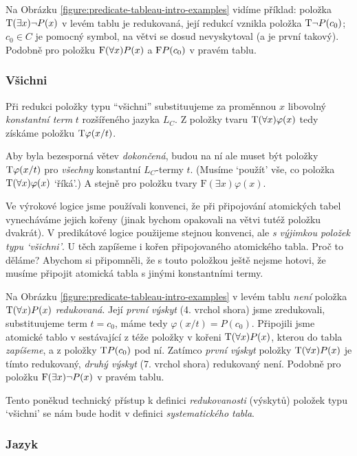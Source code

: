 Na Obrázku \ref{figure:predicate-tableau-intro-examples} vidíme příklad: položka $\mathrm{T}(\exists x)\neg P(x)$ v levém tablu je redukovaná, její redukcí vznikla položka $\mathrm{T}\neg P(c_0)$; $c_0\in C$ je pomocný symbol, na větvi se dosud nevyskytoval (a je první takový). Podobně pro položku $\mathrm{F}(\forall x)P(x)$ a $\mathrm{F} P(c_0)$ v pravém tablu.

\subsubsection{Všichni}
Při redukci položky typu ``všichni'' substituujeme za proměnnou $x$ libovolný \emph{konstantní term} $t$ rozšířeného jazyka $L_C$. Z položky tvaru $\mathrm{T}(\forall x)\varphi(x)$ tedy získáme položku $\mathrm{T}\varphi(x/t)$. 

Aby byla bezesporná větev \emph{dokončená}, budou na ní ale muset být položky $\mathrm{T}\varphi(x/t)$ pro \emph{všechny} konstantní $L_C$-termy $t$. (Musíme `použít' vše, co položka $\mathrm{T}(\forall x)\varphi(x)$ `říká'.) A stejně pro položku tvary $\mathrm{F}(\exists x)\varphi(x)$.

Ve výrokové logice jsme používali konvenci, že při připojování atomických tabel vynecháváme jejich kořeny (jinak bychom opakovali na větvi tutéž položku dvakrát). V predikátové logice použijeme stejnou konvenci, ale \emph{s výjimkou položek typu `všichni'}. U těch zapíšeme i kořen připojovaného atomického tabla. Proč to děláme? Abychom si připomněli, že s touto položkou ještě nejsme hotovi, že musíme připojit atomická tabla s jinými konstantními termy.

Na Obrázku \ref{figure:predicate-tableau-intro-examples} v levém tablu \emph{není} položka $\mathrm{T}(\forall x)P(x)$ \emph{redukovaná}. Její \emph{první výskyt} (4. vrchol shora) jsme zredukovali, substituujeme term $t=c_0$, máme tedy $\varphi(x/t)=P(c_0)$. Připojili jsme atomické tablo v sestávající z téže položky v kořeni $\mathrm{T}(\forall x)P(x)$, kterou do tabla \emph{zapíšeme}, a z položky $\mathrm{T} P(c_0)$ pod ní. Zatímco \emph{první výskyt} položky $\mathrm{T}(\forall x)P(x)$ je tímto redukovaný, \emph{druhý výskyt} (7. vrchol shora) redukovaný není. Podobně pro položku $\mathrm{F}(\exists x)\neg P(x)$ v pravém tablu.

Tento poněkud technický přístup k definici \emph{redukovanosti} (výskytů) položek typu `všichni' se nám bude hodit v definici \emph{systematického tabla}.

\subsubsection{Jazyk}

